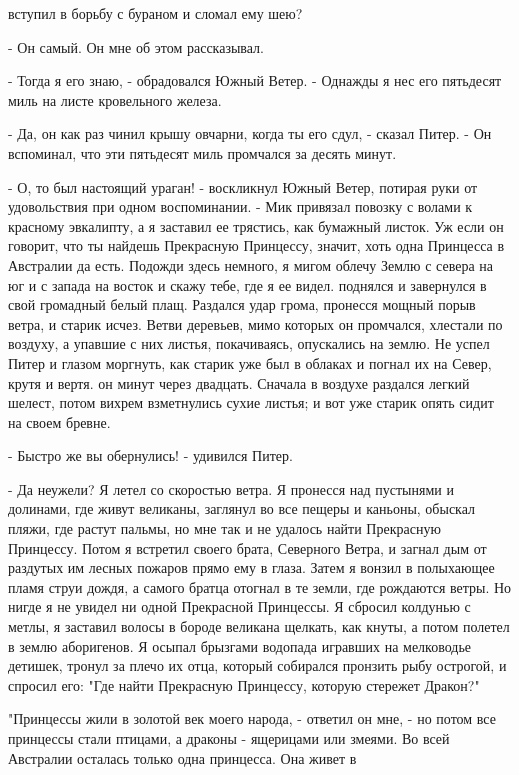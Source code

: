 вступил в борьбу с бураном и сломал ему шею?
\par- Он самый. Он мне об этом рассказывал.
\par- Тогда я его знаю, - обрадовался Южный Ветер. - Однажды я нес его 
пятьдесят миль на листе кровельного железа.
\par- Да, он как раз чинил крышу овчарни, когда ты его сдул, - сказал 
Питер. - Он вспоминал, что эти пятьдесят миль промчался за десять 
минут.
\par- О, то был настоящий ураган! - воскликнул Южный Ветер, потирая 
руки от удовольствия при одном воспоминании. - Мик привязал повозку с 
волами к красному эвкалипту, а я заставил ее трястись, как бумажный 
листок. Уж если он говорит, что ты найдешь Прекрасную Принцессу, 
значит, хоть одна Принцесса в Австралии да есть. Подожди здесь 
немного, я мигом облечу Землю с севера на юг и с запада на восток и 
скажу тебе, где я ее видел.
 поднялся и завернулся в свой громадный белый плащ. Раздался 
удар грома, пронесся мощный порыв ветра, и старик исчез. Ветви 
деревьев, мимо которых он промчался, хлестали по воздуху, а упавшие с 
них листья, покачиваясь, опускались на землю. Не успел Питер и глазом 
моргнуть, как старик уже был в облаках и погнал их на Север, крутя и 
вертя.
 он минут через двадцать. Сначала в воздухе раздался 
легкий шелест, потом вихрем взметнулись сухие листья; и вот уже старик 
опять сидит на своем бревне.
\par- Быстро же вы обернулись! - удивился Питер.
\par- Да неужели? Я летел со скоростью ветра. Я пронесся над пустынями 
и долинами, где живут великаны, заглянул во все пещеры и каньоны, 
обыскал пляжи, где растут пальмы, но мне так и не удалось найти 
Прекрасную Принцессу. Потом я встретил своего брата, Северного Ветра, 
и загнал дым от раздутых им лесных пожаров прямо ему в глаза. Затем я 
вонзил в полыхающее пламя струи дождя, а самого братца отогнал в те 
земли, где рождаются ветры. Но нигде я не увидел ни одной Прекрасной 
Принцессы. Я сбросил колдунью с метлы, я заставил волосы в бороде 
великана щелкать, как кнуты, а потом полетел в землю аборигенов. Я 
осыпал брызгами водопада игравших на мелководье детишек, тронул за 
плечо их отца, который собирался пронзить рыбу острогой, и спросил 
его: "Где найти Прекрасную Принцессу, которую стережет Дракон?"
\par"Принцессы жили в золотой век моего народа, - ответил он мне, - но 
потом все принцессы стали птицами, а драконы - ящерицами или змеями. 
Во всей Австралии осталась только одна принцесса. Она живет в 
